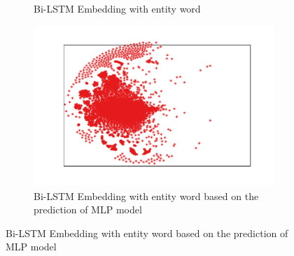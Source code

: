 \documentclass{article}
\begin{document}
\begin{figure}[t]
\begin{subfigure}[t]{0.24\textwidth}
		\caption{Bi-LSTM Embedding with entity word}
		\label{fig:bi_lstm_gold_positive}
	\end{subfigure} \hfil 
	 \begin{subfigure}[t]{0.24\textwidth}
		\includegraphics[width=\linewidth]{bi_lstm_mlp_positive.pdf}
		\caption{Bi-LSTM Embedding with entity word based on the prediction of MLP model}
		\label{fig:bi_lstm_mlp_positive}
	\end{subfigure}

	\bigskip
	

\end{figure}
\end{document}

